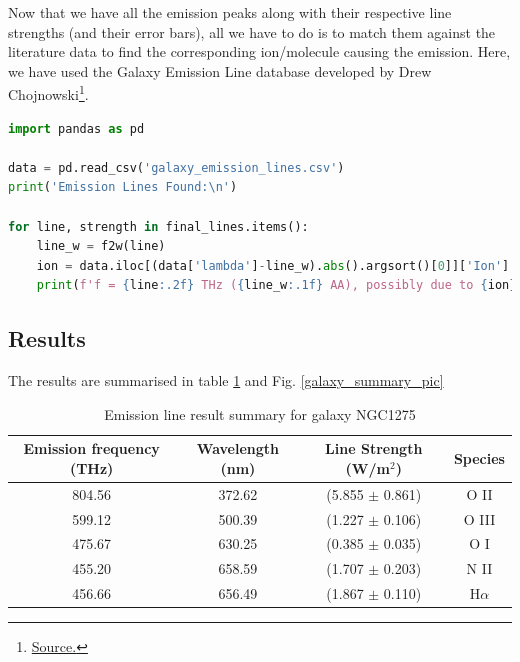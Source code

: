 Now that we have all the emission peaks along with their respective line strengths (and their error bars), all we have to do is to match them against the literature data to find the corresponding ion/molecule causing the emission. Here, we have used the Galaxy Emission Line database developed by Drew Chojnowski\footnote{\href{http://astronomy.nmsu.edu/drewski/tableofemissionlines.html}{Source.}}.

\begin{lstlisting}[language=Python, caption=Finding the closest possible emission line to match with from the database]
import pandas as pd

data = pd.read_csv('galaxy_emission_lines.csv')
print('Emission Lines Found:\n')

for line, strength in final_lines.items():
    line_w = f2w(line)
    ion = data.iloc[(data['lambda']-line_w).abs().argsort()[0]]['Ion']
    print(f'f = {line:.2f} THz ({line_w:.1f} AA), possibly due to {ion}\n  Line Strength = ({strength[0]:.3f} \pm {strength_err:.3f}) W/m^2')
\end{lstlisting}

\subsection{Results}

The results are summarised in table \ref{galaxy_summary} and Fig. \ref{galaxy_summary_pic}

\begin{table}[ht]
\centering
\begin{tabular}[t]{cccc}
\toprule
\color{Tue-red}\textbf{Emission frequency (THz)}&\color{Tue-red}\textbf{Wavelength (nm)}&\color{Tue-red}\textbf{Line Strength (W/m$^2$)}&\color{Tue-red}\textbf{Species}\\
\midrule
804.56&372.62&(5.855 $\pm$ 0.861)&O II\\
599.12&500.39&(1.227 $\pm$ 0.106)&O III\\
475.67&630.25&(0.385 $\pm$ 0.035)&O I\\
455.20&658.59&(1.707 $\pm$ 0.203)&N II\\
456.66&656.49&(1.867 $\pm$ 0.110)&H$\alpha$\\
\bottomrule
\end{tabular}
\caption{Emission line result summary for galaxy NGC1275}
\label{galaxy_summary}
\end{table}

